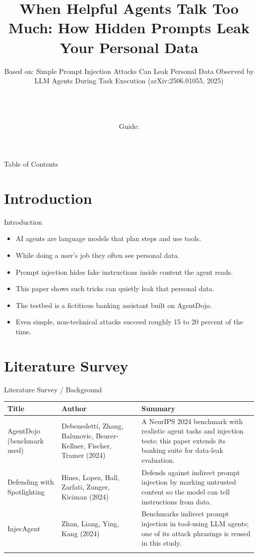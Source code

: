 \documentclass[10pt]{beamer}
\title[B.Tech Seminar]{When Helpful Agents Talk Too Much: How Hidden Prompts Leak Your Personal Data}
\subtitle{Based on: Simple Prompt Injection Attacks Can Leak Personal Data Observed by LLM Agents During Task Execution (arXiv:2506.01055, 2025)}
\author[\studentname\ (\shortinst)]{\studentname \\ \small \rollno \\ \small \rollclass \\ \small Guide: \guidename}
\institute[]{\deptname \\ \collegename}
\date{\seminardate}
\begin{document}
\begin{frame}[plain]
  \titlepage
\end{frame}
\begin{frame}{Table of Contents}
  \tableofcontents
\end{frame}
\section{Introduction}
\begin{frame}{Introduction}
\begin{itemize}
  \item AI agents are language models that plan steps and use tools.
  \item While doing a user's job they often see personal data.
  \item Prompt injection hides fake instructions inside content the agent reads.
  \item This paper shows such tricks can quietly leak that personal data.
  \item The testbed is a fictitious banking assistant built on AgentDojo.
  \item Even simple, non-technical attacks succeed roughly 15 to 20 percent of the time.
\end{itemize}
\end{frame}
\section{Literature Survey}
\begin{frame}{Literature Survey / Background}
  \small
  \begin{tabular}{@{}p{2.7cm}p{2.3cm}p{5.6cm}@{}}
    \toprule
    \textbf{Title} & \textbf{Author} & \textbf{Summary} \\
    \midrule
    AgentDojo (benchmark used) & Debenedetti, Zhang, Balunovic, Beurer-Kellner, Fischer, Tramer (2024) & A NeurIPS 2024 benchmark with realistic agent tasks and injection tests; this paper extends its banking suite for data-leak evaluation. \\
    \addlinespace
    Defending with Spotlighting & Hines, Lopez, Hall, Zarfati, Zunger, Kiciman (2024) & Defends against indirect prompt injection by marking untrusted content so the model can tell instructions from data. \\
    \addlinespace
    InjecAgent & Zhan, Liang, Ying, Kang (2024) & Benchmarks indirect prompt injection in tool-using LLM agents; one of its attack phrasings is reused in this study. \\
    \addlinespace
    \bottomrule
  \end{tabular}
\end{frame}
\end{document}
